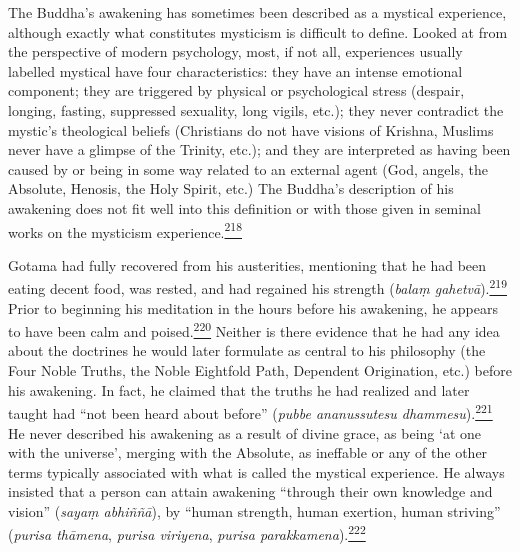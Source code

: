 The Buddha's awakening has sometimes been described as a mystical
experience, although exactly what constitutes mysticism is difficult to
define. Looked at from the perspective of modern psychology, most, if
not all, experiences usually labelled mystical have four
characteristics: they have an intense emotional component; they are
triggered by physical or psychological stress (despair, longing,
fasting, suppressed sexuality, long vigils, etc.); they never contradict
the mystic's theological beliefs (Christians do not have visions of
Krishna, Muslims never have a glimpse of the Trinity, etc.); and they
are interpreted as having been caused by or being in some way related to
an external agent (God, angels, the Absolute, Henosis, the Holy Spirit,
etc.) The Buddha's description of his awakening does not fit well into
this definition or with those given in seminal works on the mysticism
experience.\label{footprints_split_009.html_fnref218}\hyperref[footprints_split_024.htmlux5cux23fn218]{\textsuperscript{218}}

Gotama had fully recovered from his austerities, mentioning that he had
been eating decent food, was rested, and had regained his strength
(\emph{balaṃ
gahetvā}).\label{footprints_split_009.html_fnref219}\hyperref[footprints_split_024.htmlux5cux23fn219]{\textsuperscript{219}}
Prior to beginning his meditation in the hours before his awakening, he
appears to have been calm and
poised.\label{footprints_split_009.html_fnref220}\hyperref[footprints_split_024.htmlux5cux23fn220]{\textsuperscript{220}}
Neither is there evidence that he had any idea about the doctrines he
would later formulate as central to his philosophy (the Four Noble
Truths, the Noble Eightfold Path, Dependent Origination, etc.) before
his awakening. In fact, he claimed that the truths he had realized and
later taught had ``not been heard about before'' (\emph{pubbe
ananussutesu
dhammesu}).\label{footprints_split_009.html_fnref221}\hyperref[footprints_split_024.htmlux5cux23fn221]{\textsuperscript{221}}
He never described his awakening as a result of divine grace, as being
`at one with the universe', merging with the Absolute, as ineffable or
any of the other terms typically associated with what is called the
mystical experience. He always insisted that a person can attain
awakening ``through their own knowledge and vision'' (\emph{sayaṃ
abhiññā}), by ``human strength, human exertion, human striving''
(\emph{purisa thāmena}, \emph{purisa viriyena}, \emph{purisa
parakkamena}).\label{footprints_split_009.html_fnref222}\hyperref[footprints_split_024.htmlux5cux23fn222]{\textsuperscript{222}}

